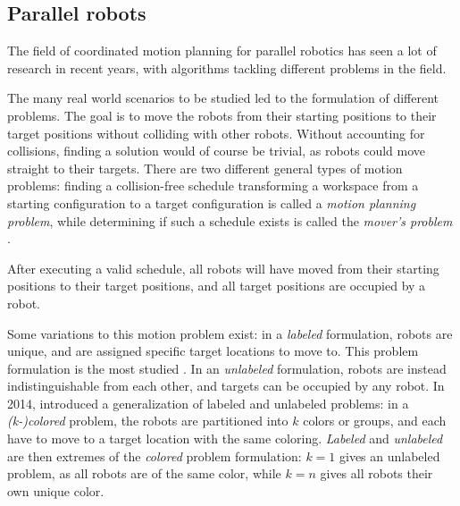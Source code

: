 \subsection{Parallel robots}

The field of coordinated motion planning for parallel robotics has seen a lot of research in recent years, with algorithms tackling different problems in the field. 

The many real world scenarios to be studied led to the formulation of different problems.
The goal is to move the robots from their starting positions to their target positions without colliding with other robots.
Without accounting for collisions, finding a solution would of course be trivial, as robots could move straight to their targets.
There are two different general types of motion problems: finding a collision-free schedule transforming a workspace from a starting configuration to a target configuration is called a \emph{motion planning problem}, while determining if such a schedule exists is called the \emph{mover's problem} \cite{siamcomp/HopcroftW86}. 

After executing a valid schedule, all robots will have moved from their starting positions to their target positions, and all target positions are occupied by a robot.

Some variations to this motion problem exist:
in a \emph{labeled} formulation, robots are unique, and are assigned specific target locations to move to. 
This problem formulation is the most studied \cite{fun/BrockenHKLS21}.
In an \emph{unlabeled} formulation, robots are instead indistinguishable from each other, and targets can be occupied by any robot. 
In 2014, \cite{ijrr/SoloveyH14} introduced a generalization of labeled and unlabeled problems: in a \emph{(k-)colored} problem, the robots are partitioned into $k$ colors or groups, and each have to move to a target location with the same coloring. 
\emph{Labeled} and \emph{unlabeled} are then extremes of the \emph{colored} problem formulation: 
$k=1$ gives an unlabeled problem, as all robots are of the same color, while $k=n$ gives all robots their own unique color. 


